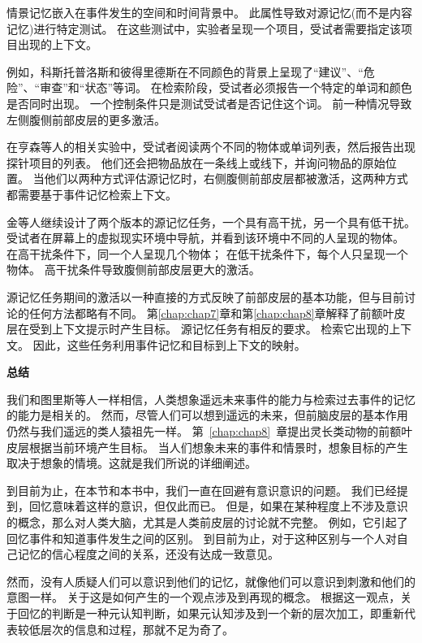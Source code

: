 情景记忆嵌入在事件发生的空间和时间背景中。
此属性导致对源记忆(而不是内容记忆)进行特定测试。
在这些测试中，实验者呈现一个项目，受试者需要指定该项目出现的上下文。


例如，科斯托普洛斯和彼得里德斯\cite{kostopoulos2008left}在不同颜色的背景上呈现了“建议”、“危险”、“审查”和“状态”等词。
在检索阶段，受试者必须报告一个特定的单词和颜色是否同时出现。
一个控制条件只是测试受试者是否记住这个词。
前一种情况导致左侧腹侧前部皮层的更多激活。


在亨森等人\cite{henson1999right}的相关实验中，受试者阅读两个不同的物体或单词列表，然后报告出现探针项目的列表。
他们还会把物品放在一条线上或线下，并询问物品的原始位置。
当他们以两种方式评估源记忆时，右侧腹侧前部皮层都被激活，这两种方式都需要基于事件记忆检索上下文。


金等人\cite{king2005anterior}继续设计了两个版本的源记忆任务，一个具有高干扰，另一个具有低干扰。
受试者在屏幕上的虚拟现实环境中导航，并看到该环境中不同的人呈现的物体。
在高干扰条件下，同一个人呈现几个物体；
在低干扰条件下，每个人只呈现一个物体。
高干扰条件导致腹侧前部皮层更大的激活。


源记忆任务期间的激活以一种直接的方式反映了前部皮层的基本功能，但与目前讨论的任何方法都略有不同。
第\ref{chap:chap7}章和第\ref{chap:chap8}章解释了前额叶皮层在受到上下文提示时产生目标。
源记忆任务有相反的要求。
检索它出现的上下文。
因此，这些任务利用事件记忆和目标到上下文的映射。



\textbf{总结}

我们和图里斯等人一样相信，人类想象遥远未来事件的能力与检索过去事件的记忆的能力是相关的。
然而，尽管人们可以想到遥远的未来，但前脑皮层的基本作用仍然与我们遥远的类人猿祖先一样。
第~\ref{chap:chap8}~章提出灵长类动物的前额叶皮层根据当前环境产生目标。
当人们想象未来的事件和情景时，想象目标的产生取决于想象的情境。这就是我们所说的详细阐述。


到目前为止，在本节和本书中，我们一直在回避有意识意识的问题。
我们已经提到，回忆意味着这样的意识，但仅此而已。
但是，如果在某种程度上不涉及意识的概念，那么对人类大脑，尤其是人类前皮层的讨论就不完整。
例如，它引起了回忆事件和知道事件发生之间的区别\cite{henson1999recollection}。
到目前为止，对于这种区别与一个人对自己记忆的信心程度之间的关系，还没有达成一致意见\cite{kim2009common}。


然而，没有人质疑人们可以意识到他们的记忆，就像他们可以意识到刺激和他们的意图一样。
关于这是如何产生的一个观点涉及到再现的概念。
根据这一观点，关于回忆的判断是一种元认知判断，如果元认知涉及到一个新的层次加工，即重新代表较低层次的信息和过程，那就不足为奇了。



